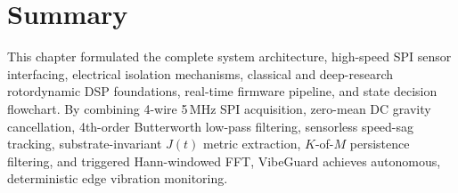 \section{Summary}
\hspace{2em}This chapter formulated the complete system architecture, high-speed SPI sensor interfacing, electrical isolation mechanisms, classical and deep-research rotordynamic DSP foundations, real-time firmware pipeline, and state decision flowchart. By combining 4-wire 5\,MHz SPI acquisition, zero-mean DC gravity cancellation, 4th-order Butterworth low-pass filtering, sensorless speed-sag tracking, substrate-invariant $J(t)$ metric extraction, $K$-of-$M$ persistence filtering, and triggered Hann-windowed FFT, VibeGuard achieves autonomous, deterministic edge vibration monitoring.
\clearpage
